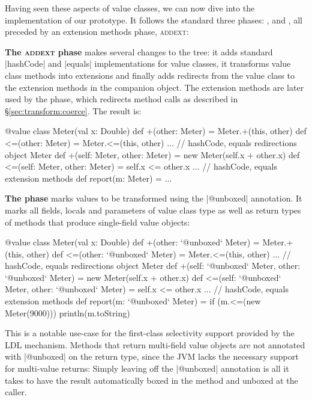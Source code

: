 Having seen these aspects of value classes, we can now dive into the implementation of our prototype. It follows the standard three phases: \inject{}, \coerce{} and \commit{}, all preceded by an extension methods phase, \textsc{addext}:

\textbf{The \textsc{addext} phase} makes several changes to the tree: it adds standard |hashCode| and |equals| implementations for value classes, it transforms value class methods into extensions and finally adds redirects from the value class to the extension methods in the companion object. The extension methods are later used by the \coerce{} phase, which redirects method calls as described in \S\ref{sec:transform:coerce}. The result is:

\begin{lstlisting-nobreak}
 @value class Meter(val x: Double) {
   def +(other: Meter) = Meter.+(this, other)
   def <=(other: Meter) = Meter.<=(this, other)
   ... // hashCode, equals redirections
 }
 object Meter {
   def +(self: Meter, other: Meter) =
     new Meter(self.x + other.x)
   def <=(self: Meter, other: Meter) =
     self.x <= other.x
   ... // hashCode, equals extension methods
 }
 def report(m: Meter) = ...
\end{lstlisting-nobreak}

\textbf{The \inject{} phase} marks values to be transformed using the |@unboxed| annotation. It marks all fields, locals and parameters of value class type as well as return types of methods that produce single-field value objects:

\begin{lstlisting-nobreak}
 @value class Meter(val x: Double) {
   def +(other: `@unboxed` Meter) =
     Meter.+(this, other)
   def <=(other: `@unboxed` Meter) =
     Meter.<=(this, other)
   ... // hashCode, equals redirections
 }
 object Meter {
   def +(self: `@unboxed` Meter, other: `@unboxed` Meter) = new Meter(self.x + other.x)
   def <=(self: `@unboxed` Meter, other: `@unboxed` Meter) = self.x <= other.x
   ... // hashCode, equals extension methods
 }
 def report(m: `@unboxed` Meter) = {
   if (m.<=(new Meter(9000)))
     println(m.toString)
 }
\end{lstlisting-nobreak}

This is a notable use-case for the first-class selectivity support provided by the LDL mechanism. Methods that return multi-field value objects are not annotated with |@unboxed| on the return type, since the JVM lacks the necessary support for multi-value returns: Simply leaving off the |@unboxed| annotation is all it takes to have the result automatically boxed in the method and unboxed at the caller.

